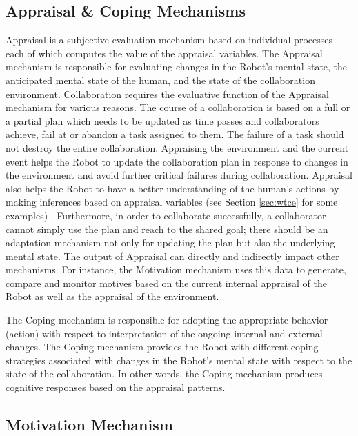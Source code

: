 \subsection{Appraisal \& Coping Mechanisms}
\label{sec:appraisal-coping-mech}

Appraisal is a subjective evaluation mechanism based on individual processes
each of which computes the value of the appraisal variables. The Appraisal
mechanism is responsible for evaluating changes in the Robot's mental state, the
anticipated mental state of the human, and the state of the collaboration
environment. Collaboration requires the evaluative function of the Appraisal
mechanism for various reasons. The course of a collaboration is based on a full
or a partial plan \cite{grosz:collaboration,grosz:discourse-structure} which
needs to be updated as time passes and collaborators achieve, fail at or abandon
a task assigned to them. The failure of a task should not destroy the entire
collaboration. Appraising the environment and the current event helps the Robot
to update the collaboration plan in response to changes in the environment and
avoid further critical failures during collaboration. Appraisal also helps the
Robot to have a better understanding of the human's actions by making inferences
based on appraisal variables (see Section \ref{sec:wtce} for some examples)
\cite{marsella:ema-process-model} \cite{scherer:appraisal-processes}.
Furthermore, in order to collaborate successfully, a collaborator cannot simply
use the plan and reach to the shared goal; there should be an adaptation
mechanism not only for updating the plan but also the underlying mental state.
The output of Appraisal can directly and indirectly impact other mechanisms. For
instance, the Motivation mechanism uses this data to generate, compare and
monitor motives based on the current internal appraisal of the Robot as well as
the appraisal of the environment.

The Coping mechanism is responsible for adopting the appropriate behavior
(action) with respect to interpretation of the ongoing internal and external
changes. The Coping mechanism provides the Robot with different coping
strategies associated with changes in the Robot's mental state with respect to
the state of the collaboration. In other words, the Coping mechanism produces
cognitive responses based on the appraisal patterns.

\subsection{Motivation Mechanism}
\label{sec:motivation-mech}

